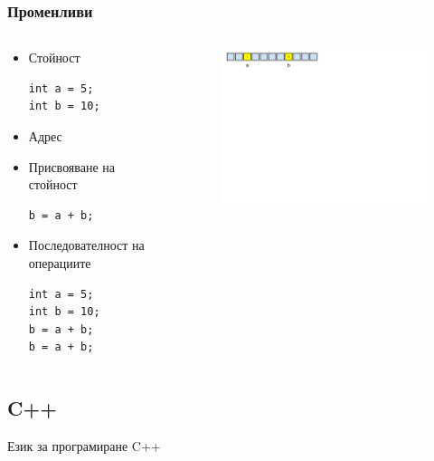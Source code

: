 \documentclass{beamer}
\begin{document}
\begin{frame}[fragile]
\frametitle{Променливи}


\begin{columns}[t]
  \begin{column}{0.7\textwidth}

\begin{itemize}
\item Стойност
\begin{lstlisting}
int a = 5;
int b = 10;
\end{lstlisting}
\item Адрес
\item Присвояване на стойност
\begin{lstlisting}
b = a + b;
\end{lstlisting}
\item Последователност на операциите
\begin{lstlisting}
int a = 5;
int b = 10;
b = a + b;
b = a + b;
\end{lstlisting}
\end{itemize}

  \end{column}



  \begin{column}{0.4\textwidth}
\begin{figure}
\includegraphics[width=8.5cm]{images/fig_variables}
\end{figure}
  \end{column}
\end{columns}

\end{frame}

\subsection{C++} 

\begin{frame}
\centerline{Език за програмиране C++}
\end{frame}
\end{document}

